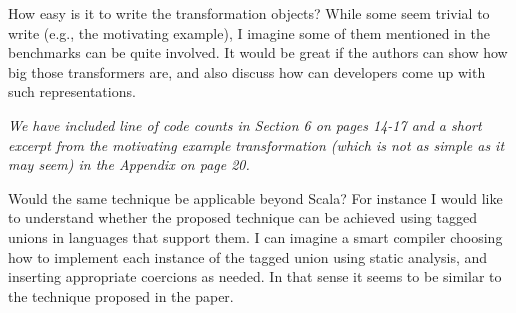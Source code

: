 \documentclass[9pt]{article}
\newenvironment{packed_item}{
\begin{itemize}
  \setlength{\itemsep}{1pt}
  \setlength{\parskip}{0.2pt}
  \setlength{\parsep}{0.2pt}
}{
  \end{itemize}
}
\newenvironment{reviewer-addr}
{ \color{OliveGreen} \framebox{{\bf FEEDBACK}} }
{  }
\newenvironment{answer}
{ \em \framebox{{\bf AUTHOR RESPONSE}} }
{  }
\begin{document}
\begin{reviewer-addr}
\begin{packed_item}
\item How easy is it to write the transformation objects? While some
seem trivial to write (e.g., the motivating example), I imagine some of them
mentioned in the benchmarks can be quite involved. It would be great if the
authors can show how big those transformers are, and also discuss how can
developers come up with such representations.
\end{packed_item}
\end{reviewer-addr}

\begin{answer}
We have included line of code counts in Section 6 on pages 14-17 and a short excerpt from the motivating example transformation (which is not as simple as it may seem) in the Appendix on page 20.
\end{answer}

\vspace{20mm}

\begin{reviewer-addr}
\begin{packed_item}
\item Would the same technique be applicable beyond Scala? For instance
I would like to understand whether the proposed technique can be achieved
using tagged unions in languages that support them. I can imagine a smart
compiler choosing how to implement each instance of the tagged union using
static analysis, and inserting appropriate coercions as needed. In that sense
it seems to be similar to the technique proposed in the paper.
\end{packed_item}
\end{reviewer-addr}
\end{document}

